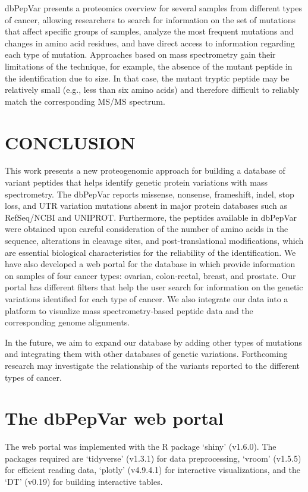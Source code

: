 \documentclass{ieeeaccess}
\begin{document}
dbPepVar presents a proteomics overview for several samples from different types of cancer, allowing researchers to search for information on the set of mutations that affect specific groups of samples, analyze the most frequent mutations and changes in amino acid residues, and have direct access to information regarding each type of mutation. Approaches based on mass spectrometry gain their limitations of the technique, for example, the absence of the mutant peptide in the identification due to size. In that case, the mutant tryptic peptide may be relatively small (e.g., less than six amino acids) and therefore difficult to reliably match the corresponding MS/MS spectrum.  

\section{CONCLUSION}

This work presents a new proteogenomic approach for building a database of variant peptides that helps identify genetic protein variations with mass spectrometry. The dbPepVar reports missense, nonsense, frameshift, indel, stop loss, and UTR variation mutations absent in major protein databases such as RefSeq/NCBI and UNIPROT. Furthermore, the peptides available in dbPepVar were obtained upon careful consideration of the number of amino acids in the sequence, alterations in cleavage sites, and post-translational modifications, which are essential biological characteristics for the reliability of the identification. We have also developed a web portal for the database in which provide information on samples of four cancer types: ovarian, colon-rectal, breast, and prostate. Our portal has different filters that help the user search for information on the genetic variations identified for each type of cancer. We also integrate our data into a platform to visualize mass spectrometry‐based peptide data and the corresponding genome alignments.

In the future, we aim to expand our database by adding other types of mutations and integrating them with other databases of genetic variations. Forthcoming research may investigate the relationship of the variants reported to the different types of cancer.

\section{The dbPepVar web portal}

The web portal was implemented with the R package `shiny' (v1.6.0). The packages required are `tidyverse' (v1.3.1) for data preprocessing, `vroom' (v1.5.5) for efficient reading data, `plotly' (v4.9.4.1) for interactive visualizations, and the `DT' (v0.19) for building interactive tables.
\end{document}
